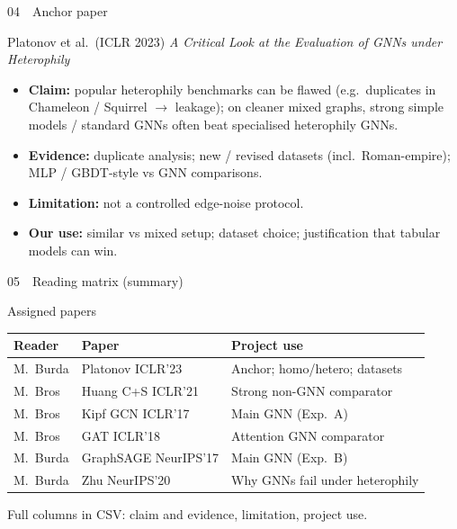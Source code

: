 \documentclass[
  english,
  aspectratio=169,
]{beamer}
\begin{document}
\begin{frame}{04~~Anchor paper}
  \begin{block}{Platonov et al.\ (ICLR 2023)}
    \emph{A Critical Look at the Evaluation of GNNs under Heterophily}
  \end{block}

  \begin{itemize}
    \item \textbf{Claim:} popular heterophily benchmarks can be flawed
      (e.g.\ duplicates in Chameleon / Squirrel $\rightarrow$ leakage);
      on cleaner mixed graphs, strong simple models / standard GNNs
      often beat specialised heterophily GNNs.
    \item \textbf{Evidence:} duplicate analysis; new / revised datasets
      (incl.\ Roman-empire); MLP / GBDT-style vs GNN comparisons.
    \item \textbf{Limitation:} not a controlled edge-noise protocol.
    \item \textbf{Our use:} similar vs mixed setup; dataset choice;
      justification that tabular models can win.
  \end{itemize}
\end{frame}

\begin{frame}{05~~Reading matrix (summary)}
  \begin{block}{Assigned papers}
    \scriptsize
    \renewcommand{\arraystretch}{1.2}
    \begin{tabular}{p{2.2cm}p{4.2cm}p{4.4cm}}
      \textbf{Reader} & \textbf{Paper} & \textbf{Project use} \\
      \hline
      M.~Burda & Platonov ICLR'23 & Anchor; homo/hetero; datasets \\
      M.~Bros & Huang C+S ICLR'21 & Strong non-GNN comparator \\
      M.~Bros & Kipf GCN ICLR'17 & Main GNN (Exp.\ A) \\
      M.~Bros & GAT ICLR'18 & Attention GNN comparator \\
      M.~Burda & GraphSAGE NeurIPS'17 & Main GNN (Exp.\ B) \\
      M.~Burda & Zhu NeurIPS'20 & Why GNNs fail under heterophily \\
    \end{tabular}
  \end{block}

  \vspace{0.4em}
  {\small Full columns in CSV: claim and evidence, limitation, project use.}
\end{frame}
\end{document}
